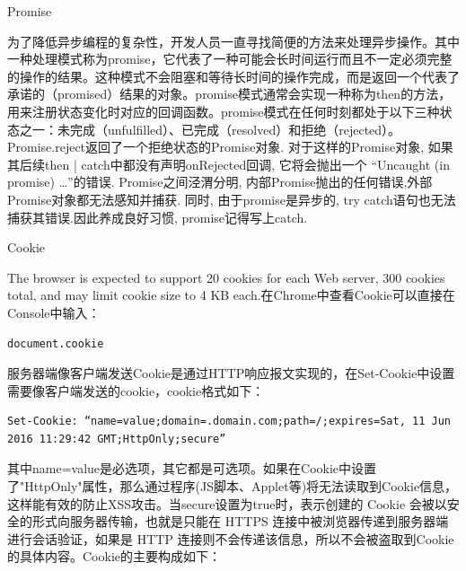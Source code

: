 \documentclass[11pt,fleqn]{book}
\makeatletter
\numberwithin{dummy}{section}
\theoremstyle{ocrenumbox}
\theoremstyle{blacknumex}
\theoremstyle{blacknumbox}
\theoremstyle{ocrenum}
\renewcommand{\section}{\@startsection{section}{1}{\z@}
	{-4ex \@plus -1ex \@minus -.4ex}
	{1ex \@plus.2ex }
	{\normalfont\large\sffamily\bfseries}}
\renewcommand{\subsection}{\@startsection {subsection}{2}{\z@}
	{-3ex \@plus -0.1ex \@minus -.4ex}
	{0.5ex \@plus.2ex }
	{\normalfont\sffamily\bfseries}}
\makeatother
\begin{document}
\subsection{Promise}

为了降低异步编程的复杂性，开发人员一直寻找简便的方法来处理异步操作。其中一种处理模式称为promise，它代表了一种可能会长时间运行而且不一定必须完整的操作的结果。这种模式不会阻塞和等待长时间的操作完成，而是返回一个代表了承诺的（promised）结果的对象。promise模式通常会实现一种称为then的方法，用来注册状态变化时对应的回调函数。promise模式在任何时刻都处于以下三种状态之一：未完成（unfulfilled）、已完成（resolved）和拒绝（rejected）。Promise.reject返回了一个拒绝状态的Promise对象. 对于这样的Promise对象, 如果其后续then | catch中都没有声明onRejected回调, 它将会抛出一个 “Uncaught (in promise) …”的错误. Promise之间泾渭分明, 内部Promise抛出的任何错误,外部Promise对象都无法感知并捕获. 同时, 由于promise是异步的, try catch语句也无法捕获其错误.因此养成良好习惯, promise记得写上catch.

\section{Cookie}

The browser is expected to support 20 cookies for each Web server, 300 cookies total, and may limit cookie size to 4 KB each.在Chrome中查看Cookie可以直接在Console中输入：

\begin{lstlisting}[language=Bash]
document.cookie
\end{lstlisting}

服务器端像客户端发送Cookie是通过HTTP响应报文实现的，在Set-Cookie中设置需要像客户端发送的cookie，cookie格式如下：

\begin{lstlisting}
Set-Cookie: “name=value;domain=.domain.com;path=/;expires=Sat, 11 Jun 2016 11:29:42 GMT;HttpOnly;secure”
\end{lstlisting}

其中name=value是必选项，其它都是可选项。如果在Cookie中设置了"HttpOnly"属性，那么通过程序(JS脚本、Applet等)将无法读取到Cookie信息，这样能有效的防止XSS攻击。当secure设置为true时，表示创建的 Cookie 会被以安全的形式向服务器传输，也就是只能在 HTTPS 连接中被浏览器传递到服务器端进行会话验证，如果是 HTTP 连接则不会传递该信息，所以不会被盗取到Cookie 的具体内容。Cookie的主要构成如下：
\end{document}
